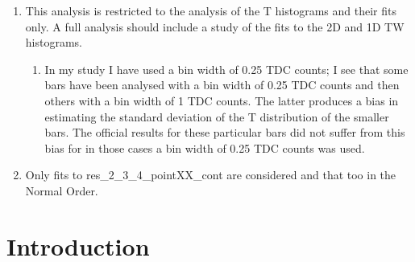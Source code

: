 \documentclass[12pt]{article}
\begin{document}
\maketitle


 
\begin{enumerate}
	\item This analysis is restricted to the analysis of the T histograms and their fits only. A full analysis should include a study of the fits to the 2D and 1D TW histograms.
		\begin{enumerate}
			\item In my study I have used a bin width of 0.25 TDC counts; I see that some bars have been analysed with a bin width of 0.25 TDC counts and then others with a bin width of 1 TDC counts. The latter produces a bias in estimating the standard deviation of the T distribution of the smaller bars. The official results for these particular bars did not suffer from this bias for in those cases a bin width of 0.25 TDC counts was used.
		\end{enumerate}
	\item Only fits to res\_2\_3\_4\_pointXX\_cont are considered and that too in the Normal Order.
\end{enumerate}

\section{Introduction}

\end{document}
